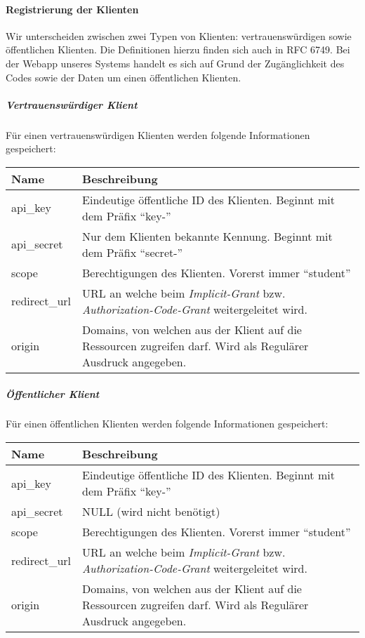 \paragraph{Registrierung der Klienten}
Wir unterscheiden zwischen zwei Typen von Klienten: vertrauenswürdigen sowie öffentlichen Klienten. Die Definitionen hierzu finden sich auch in RFC 6749. Bei der Webapp unseres Systems handelt es sich auf Grund der Zugänglichkeit des Codes sowie der Daten um einen öffentlichen Klienten.
\subparagraph{Vertrauenswürdiger Klient}
Für einen vertrauenswürdigen Klienten werden folgende Informationen gespeichert:\\
\begin{tabularx}{\textwidth}{@{} | X | X | @{}}
	\hline
	\textbf{Name} & \textbf{Beschreibung}\\ \hline \hline
	api\_key & Eindeutige öffentliche ID des Klienten. Beginnt mit dem Präfix \enquote{key-} \\ \hline
	api\_secret & Nur dem Klienten bekannte Kennung. Beginnt mit dem Präfix \enquote{secret-} \\ \hline
	scope & Berechtigungen des Klienten. Vorerst immer \enquote{student} \\ \hline
	redirect\_url & URL an welche beim \textit{Implicit-Grant} bzw. \textit{Authorization-Code-Grant} weitergeleitet wird. \\ \hline
	origin & Domains, von welchen aus der Klient auf die Ressourcen zugreifen darf. Wird als Regulärer Ausdruck angegeben. \\
	\hline
\end{tabularx}

\subparagraph{Öffentlicher Klient}
Für einen öffentlichen Klienten werden folgende Informationen gespeichert:\\
\begin{tabularx}{\textwidth}{@{} | X | X | @{}}
	\hline
	\textbf{Name} & \textbf{Beschreibung}\\ \hline \hline
	api\_key & Eindeutige öffentliche ID des Klienten. Beginnt mit dem Präfix \enquote{key-} \\ \hline
	api\_secret & NULL (wird nicht benötigt) \\ \hline
	scope & Berechtigungen des Klienten. Vorerst immer \enquote{student} \\ \hline
	redirect\_url & URL an welche beim \textit{Implicit-Grant} bzw. \textit{Authorization-Code-Grant} weitergeleitet wird. \\ \hline
	origin & Domains, von welchen aus der Klient auf die Ressourcen zugreifen darf. Wird als Regulärer Ausdruck angegeben. \\
	\hline
\end{tabularx}
